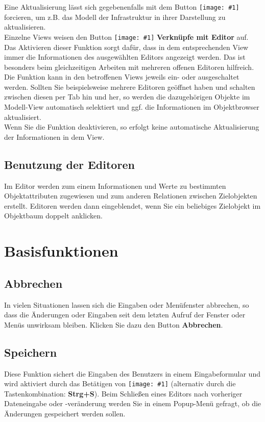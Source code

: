 \documentclass[a4paper,10pt]{book}
\newcommand{\icon}[1]{\texttt{[image: \#1]}}
\begin{document}
Eine Aktualisierung lässt sich gegebenenfalls mit dem Button \icon{Icon/Aktualisieren.png} forcieren, um z.B. das Modell der Infrastruktur in ihrer Darstellung zu aktualisieren.
\newline\\
Einzelne Views weisen den Button \icon{Icon/Verinice_linked.png} \textbf{Verknüpfe mit Editor} auf.
Das Aktivieren dieser Funktion sorgt dafür, dass in dem entsprechenden View immer die Informationen des ausgewählten Editors
angezeigt werden. Das ist besonders beim gleichzeitigen Arbeiten mit mehreren offenen Editoren hilfreich. Die Funktion kann in
den betroffenen Views jeweils ein- oder ausgeschaltet werden. Sollten Sie beispielsweise mehrere Editoren geöffnet haben und
schalten zwischen diesen per Tab hin und her, so werden die dazugehörigen Objekte im Modell-View automatisch selektiert und
ggf. die Informationen im Objektbrowser aktualisiert.
\newline\\
Wenn Sie die Funktion deaktivieren, so erfolgt keine automatische Aktualisierung der Informationen in dem View.

\section{Benutzung der Editoren}
Im Editor werden zum einem Informationen und Werte zu bestimmten Objektattributen zugewiesen und zum anderen Relationen zwischen Zielobjekten erstellt.
Editoren werden dann eingeblendet, wenn Sie ein beliebiges Zielobjekt im Objektbaum doppelt anklicken.

\chapter{Basisfunktionen}
\section{Abbrechen}
In vielen Situationen lassen sich die Eingaben oder Menüfenster abbrechen, so dass die Änderungen oder Eingaben seit dem
letzten Aufruf der Fenster oder Menüs unwirksam bleiben. Klicken Sie dazu den Button \textbf{Abbrechen}.

\section{Speichern}
Diese Funktion sichert die Eingaben des Benutzers in einem Eingabeformular und wird aktiviert durch das Betätigen von \icon{Icon/Disk.png}
(alternativ durch die Tastenkombination: \textbf{Strg+S}). Beim Schließen eines
Editors nach vorheriger Dateneingabe oder \mbox{-veränderung} werden Sie in einem Popup-Menü gefragt, ob die Änderungen gespeichert werden sollen.
\end{document}
